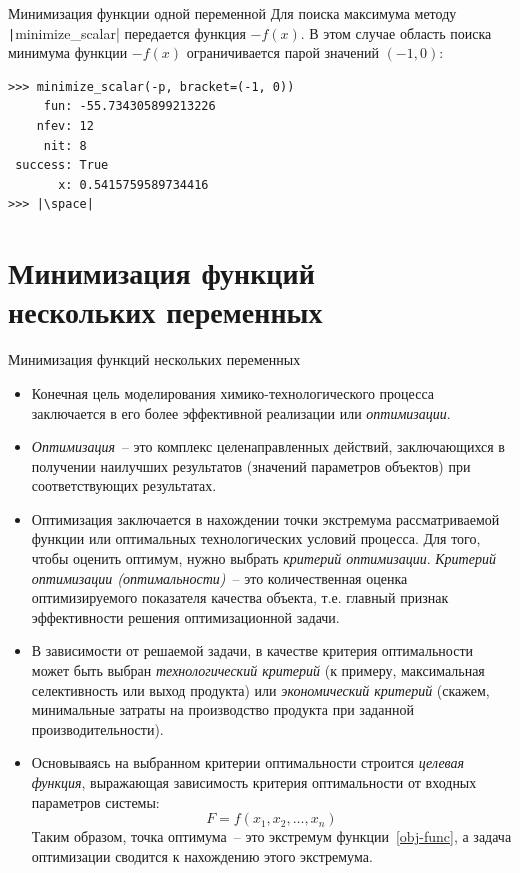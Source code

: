 \documentclass[aspectratio=169, mathserif]{beamer}	%
\begin{document}
\begin{frame}[fragile]{Минимизация функции одной переменной}
\scriptsize
Для поиска максимума методу \texttt|minimize_scalar| передается функция $-f(x)$. В этом случае область поиска минимума функции $-f(x)$ ограничивается парой значений $(-1, 0)$:
\vfill
\begin{verbatim}
>>> minimize_scalar(-p, bracket=(-1, 0))
     fun: -55.734305899213226
    nfev: 12
     nit: 8
 success: True
       x: 0.5415759589734416
>>> |\space|
\end{verbatim}
\vfill
\end{frame}

\section{Минимизация функций \\ нескольких переменных}
\sectionframe

\begin{frame}[fragile]{Минимизация функций нескольких переменных}
\scriptsize
\begin{itemize}
	\item Конечная цель моделирования химико-технологического процесса заключается в его более эффективной реализации или \textit{оптимизации}.

	\item \textit{Оптимизация}~-- это комплекс целенаправленных действий, заключающихся в получении наилучших результатов (значений параметров объектов) при соответствующих результатах.

	\item Оптимизация заключается в нахождении точки экстремума рассматриваемой функции или оптимальных технологических условий процесса. Для того, чтобы оценить оптимум, нужно выбрать \textit{критерий оптимизации}. \textit{Критерий оптимизации (оптимальности)}~-- это количественная оценка оптимизируемого показателя качества объекта, т.е. главный признак эффективности решения оптимизационной задачи.

	\item В зависимости от решаемой задачи, в качестве критерия оптимальности может быть выбран \textit{технологический критерий} (к примеру, максимальная селективность или выход продукта) или \textit{экономический критерий} (скажем, минимальные затраты на производство продукта при заданной производительности).

	\item Основываясь на выбранном критерии оптимальности строится \textit{целевая функция}, выражающая зависимость критерия оптимальности от входных параметров системы:
	\begin{equation}\label{obj-func}
		F = f(x_1, x_2, \ldots, x_n)
	\end{equation}
	Таким образом, точка оптимума~-- это экстремум функции~\eqref{obj-func}, а задача оптимизации сводится к нахождению этого экстремума.
\end{itemize}
\vfill
\end{frame}
\end{document}
